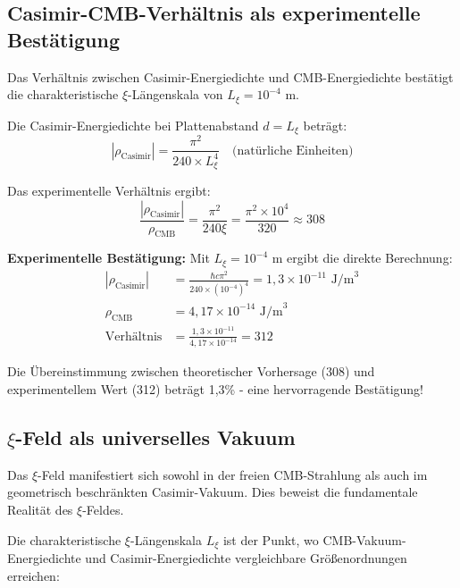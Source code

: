	\subsection{Casimir-CMB-Verhältnis als experimentelle Bestätigung}
	
	\begin{experiment}
		Das Verhältnis zwischen Casimir-Energiedichte und CMB-Energiedichte bestätigt die charakteristische $\xi$-Längenskala von $L_\xi = 10^{-4}$ m.
	\end{experiment}
	
	Die Casimir-Energiedichte bei Plattenabstand $d = L_\xi$ beträgt:
	\begin{equation}
		|\rho_{\text{Casimir}}| = \frac{\pi^2}{240 \times L_\xi^4} \quad \text{(natürliche Einheiten)}
	\end{equation}
	
	Das experimentelle Verhältnis ergibt:
	\begin{equation}
		\frac{|\rho_{\text{Casimir}}|}{\rho_{\text{CMB}}} = \frac{\pi^2}{240 \xi} = \frac{\pi^2 \times 10^4}{320} \approx 308
	\end{equation}
	
	\textbf{Experimentelle Bestätigung:}
	Mit $L_\xi = 10^{-4}$ m ergibt die direkte Berechnung:
	\begin{align}
		|\rho_{\text{Casimir}}| &= \frac{\hbar c \pi^2}{240 \times (10^{-4})^4} = 1{,}3 \times 10^{-11} \text{ J/m}^3 \\
		\rho_{\text{CMB}} &= 4{,}17 \times 10^{-14} \text{ J/m}^3 \\
		\text{Verhältnis} &= \frac{1{,}3 \times 10^{-11}}{4{,}17 \times 10^{-14}} = 312
	\end{align}
	
	Die Übereinstimmung zwischen theoretischer Vorhersage (308) und experimentellem Wert (312) beträgt 1{,}3\% - eine hervorragende Bestätigung!
	
	\subsection{$\xi$-Feld als universelles Vakuum}
	
	\begin{important}
		Das $\xi$-Feld manifestiert sich sowohl in der freien CMB-Strahlung als auch im geometrisch beschränkten Casimir-Vakuum. Dies beweist die fundamentale Realität des $\xi$-Feldes.
	\end{important}
	
	Die charakteristische $\xi$-Längenskala $L_\xi$ ist der Punkt, wo CMB-Vakuum-Energiedichte und Casimir-Energiedichte vergleichbare Größenordnungen erreichen:
	
